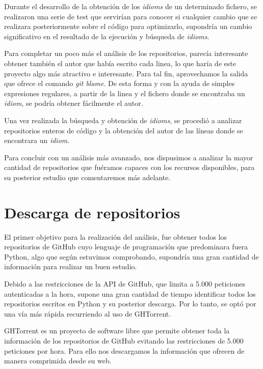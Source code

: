 \documentclass[a4paper, 12pt]{book}
\begin{document}
Durante el desarrollo de la obtención de los \textit{idioms} de un determinado fichero, se realizaron una serie de test que servirían para conocer si cualquier cambio que se realizara posteriormente sobre el código para optimizarlo, supondría un cambio significativo en el resultado de la ejecución y búsqueda de \textit{idioms}.

Para completar un poco más el análisis de los repositorios, parecía interesante obtener también el autor que había escrito cada linea, lo que haría de este proyecto algo más atractivo e interesante. Para tal fin, aprovechamos la salida que ofrece el comando \textit{git blame}. De esta forma y con la ayuda de simples expresiones regulares, a partir de la linea y el fichero donde se encontraba un \textit{idiom}, se podría obtener fácilmente el autor.

Una vez realizada la búsqueda y obtención de \textit{idioms}, se procedió a analizar repositorios enteros de código y la obtención del autor de las líneas donde se encontrara un \textit{idiom}.

Para concluir con un análisis más avanzado, nos dispusimos a analizar la mayor cantidad de repositorios que fuéramos capaces con los recursos disponibles, para su posterior estudio que comentaremos más adelante.




\section{Descarga de repositorios}
\label{sec:download_repositories}

El primer objetivo para la realización del análisis, fue obtener todos los repositorios de GitHub cuyo lenguaje de programación que predominara fuera Python, algo que según estuvimos comprobando, supondría una gran cantidad de información para realizar un buen estudio.

Debido a las restricciones de la API de GitHub, que limita a 5.000 peticiones autenticadas a la hora, supone una gran cantidad de tiempo identificar todos los repositorios escritos en Python y su posterior descarga. Por lo tanto, se optó por una vía más rápida recurriendo al uso de GHTorrent.

GHTorrent es un proyecto de software libre que permite obtener toda la información de los repositorios de GitHub evitando las restricciones de 5.000 peticiones por hora. Para ello nos descargamos la información que ofrecen de manera comprimida desde su web.
\end{document}
